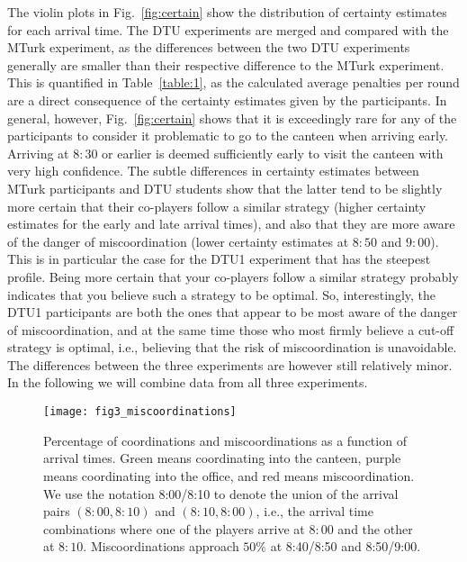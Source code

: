The violin plots in Fig.~\ref{fig:certain} show the distribution of certainty estimates for each arrival time. The DTU experiments are merged and compared with the MTurk experiment, as the differences between the two DTU experiments generally are smaller than their respective difference to the MTurk experiment. This is quantified in Table~\ref{table:1}, as the calculated average penalties per round are a direct consequence of the certainty estimates given by the participants. In general, however, Fig.~\ref{fig:certain} shows that it is exceedingly rare for any of the participants to consider it problematic to go to the canteen when arriving early. Arriving at $8{:}30$ or earlier is deemed sufficiently early to visit the canteen with very high confidence. %
The subtle differences in certainty estimates between MTurk participants and DTU students show that the latter tend to be slightly more certain that their co-players follow a similar strategy (higher certainty estimates for the early and late arrival times), and also that they are more aware of the danger of miscoordination (lower certainty estimates at $8{:}50$ and $9{:}00$). This is in particular the case for the DTU1 experiment that has the steepest profile. Being more certain that your co-players follow a similar strategy probably indicates that you believe such a strategy to be optimal. So, interestingly, the DTU1 participants are both the ones that appear to be most aware of the danger of miscoordination, and at the same time those who most firmly believe a cut-off strategy is optimal, i.e., believing that the risk of miscoordination is unavoidable. The differences between the three experiments are however still relatively minor. In the following we will combine data from all three experiments.

\begin{figure} %
\centering\texttt{[image: fig3\_miscoordinations]}
\caption{Percentage of coordinations and miscoordinations as a function of arrival times. Green means coordinating into the canteen, purple means coordinating into the office, and red means miscoordination. We use the notation 8:00/8:10 to denote the union of the arrival pairs $(8{:}00,8{:}10)$ and $(8{:}10,8{:}00)$, i.e., the arrival time combinations where one of the players arrive at $8{:}00$ and the other at $8{:}10$. Miscoordinations approach $50\%$ at 8:40/8:50 and 8:50/9:00.}
\label{fig:miscoordinations}
\end{figure}

